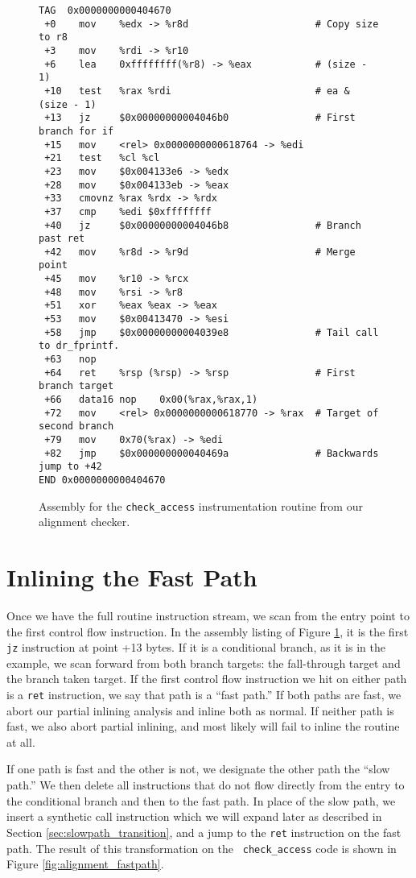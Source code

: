 \begin{figure}
\begin{verbatim}
TAG  0x0000000000404670
 +0    mov    %edx -> %r8d                      # Copy size to r8
 +3    mov    %rdi -> %r10
 +6    lea    0xffffffff(%r8) -> %eax           # (size - 1)
 +10   test   %rax %rdi                         # ea & (size - 1)
 +13   jz     $0x00000000004046b0               # First branch for if
 +15   mov    <rel> 0x0000000000618764 -> %edi
 +21   test   %cl %cl
 +23   mov    $0x004133e6 -> %edx
 +28   mov    $0x004133eb -> %eax
 +33   cmovnz %rax %rdx -> %rdx
 +37   cmp    %edi $0xffffffff
 +40   jz     $0x00000000004046b8               # Branch past ret
 +42   mov    %r8d -> %r9d                      # Merge point
 +45   mov    %r10 -> %rcx
 +48   mov    %rsi -> %r8
 +51   xor    %eax %eax -> %eax
 +53   mov    $0x00413470 -> %esi
 +58   jmp    $0x00000000004039e8               # Tail call to dr_fprintf.
 +63   nop
 +64   ret    %rsp (%rsp) -> %rsp               # First branch target
 +66   data16 nop    0x00(%rax,%rax,1)
 +72   mov    <rel> 0x0000000000618770 -> %rax  # Target of second branch
 +79   mov    0x70(%rax) -> %edi
 +82   jmp    $0x000000000040469a               # Backwards jump to +42
END 0x0000000000404670
\end{verbatim}
\caption{Assembly for the {\tt check\_access} instrumentation routine from our
alignment checker.}
\label{fig:alignment_asm}
\end{figure}

\section{Inlining the Fast Path}
\label{sec:inlining_fastpath}

Once we have the full routine instruction stream, we scan from the entry point
to the first control flow instruction.  In the assembly listing of Figure
\ref{fig:alignment_asm}, it is the first {\tt jz} instruction at point +13
bytes.  If it is a conditional branch, as it is in the example, we scan forward
from both branch targets: the fall-through target and the branch taken target.
If the first control flow instruction we hit on either path is a {\tt ret}
instruction, we say that path is a ``fast path.''  If both paths are fast, we
abort our partial inlining analysis and inline both as normal.  If neither path
is fast, we also abort partial inlining, and most likely will fail to inline the
routine at all.

If one path is fast and the other is not, we designate the other path the ``slow
path.''  We then delete all instructions that do not flow directly from the
entry to the conditional branch and then to the fast path.  In place of the slow
path, we insert a synthetic call instruction which we will expand later as
described in Section \ref{sec:slowpath_transition}, and a jump to the {\tt ret}
instruction on the fast path.  The result of this transformation on the {\tt
check\_access} code is shown in Figure \ref{fig:alignment_fastpath}.

